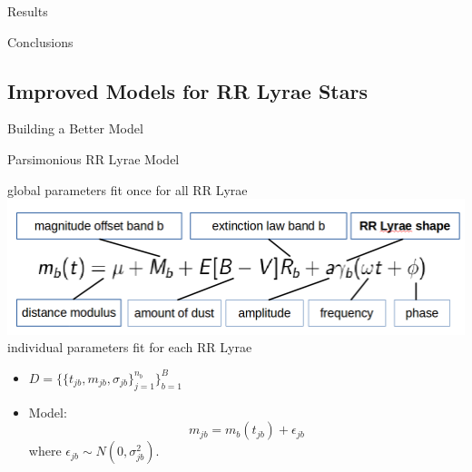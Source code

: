 \documentclass[12pt]{beamer}
\begin{document}
\begin{frame}{Results}



\end{frame}


\begin{frame}{Conclusions}

\end{frame}




\subsection{Improved Models for RR Lyrae Stars}

\begin{frame}{Building a Better Model}

\end{frame}

\begin{frame}{Parsimonious RR Lyrae Model}


\begin{center}
global parameters fit once for all RR Lyrae\\
\includegraphics[scale=.3]{figs/model.png}\\
individual parameters fit for each RR Lyrae
\end{center}

\vspace{.2in}

\begin{itemize}
\item $D=\{\{t_{jb},m_{jb},\sigma_{jb}\}_{j=1}^{n_b}\}_{b=1}^B$
\item Model:
\begin{equation*}
m_{jb} = m_b(t_{jb}) + \epsilon_{jb}
\end{equation*}
where $\epsilon_{jb} \sim N(0,\sigma_{jb}^2)$.
\end{itemize}
\end{frame}
\end{document}
